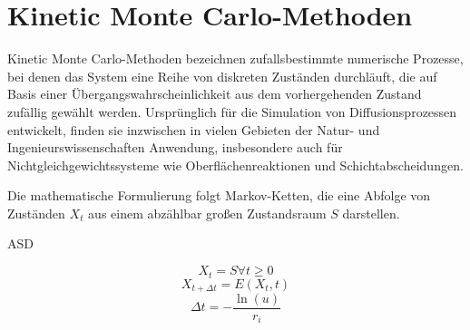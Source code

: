 \section{Kinetic Monte Carlo-Methoden}
\label{kmc}

Kinetic Monte Carlo-Methoden bezeichnen zufallsbestimmte numerische Prozesse, bei denen das System eine Reihe von diskreten Zuständen durchläuft, die auf Basis einer Übergangswahrscheinlichkeit aus dem vorhergehenden Zustand zufällig gewählt werden.
Ursprünglich für die Simulation von  Diffusionsprozessen entwickelt, finden sie inzwischen in vielen Gebieten der Natur- und Ingenieurswissenschaften Anwendung, insbesondere auch für Nichtgleichgewichtssysteme wie  Oberflächenreaktionen und Schichtabscheidungen.

Die mathematische Formulierung folgt Markov-Ketten, die eine Abfolge von Zuständen $X_t$ aus einem abzählbar großen Zustandsraum $S$ darstellen.

ASD

$$
X_t = S \forall t \geq 0
$$
$$
X_{t+\Delta t} = E(X_t, t)
$$
$$
\Delta t = - \frac{\ln(u)}{r_i}
$$


